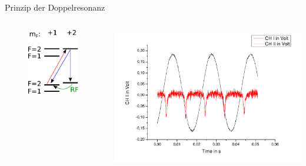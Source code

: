 \documentclass{beamer}
\begin{document}
\begin{frame}{Prinzip der Doppelresonanz}
\begin{columns}
\begin{column}{3.5cm}
	\begin{figure}[H]
	\centering \includegraphics[width=\textwidth]{Bilder/OPRF.pdf}
	\end{figure}
\end{column}
\begin{column}{6.5cm}
\centering \includegraphics[width=1.1\textwidth]{Bilder/DR_sin.pdf}
\end{column}
\end{columns}
\end{frame}
\end{document}
